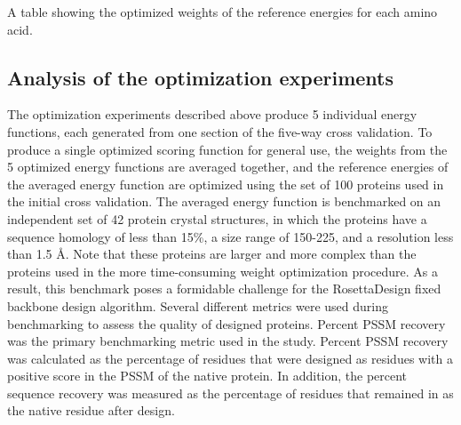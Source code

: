 \begin{table}
\scriptsize
\renewcommand{\tabcolsep}{0.09cm}
\centering

\caption{A table showing the optimized weights of the reference energies for each amino acid. }
\label{table:ref_energy_weights}
\end{table}

\subsection{Analysis of the optimization experiments}
The optimization experiments described above produce 5 individual energy functions, each generated from one section of the five-way cross validation.
To produce a single optimized scoring function for general use, the weights from the 5 optimized energy functions are averaged together, and the reference energies of the averaged energy function are optimized using the set of 100 proteins used in the initial  cross validation.
The averaged energy function is benchmarked on an independent set of 42 protein crystal structures, in which the proteins have a sequence homology of less than 15\%, a size range of 150-225, and a resolution less than 1.5 \AA.
Note that these proteins are larger and more complex than the proteins used in the more time-consuming weight optimization procedure.
As a result, this benchmark poses a formidable challenge for the RosettaDesign fixed backbone design algorithm.
Several different metrics were used during benchmarking to assess the quality of designed proteins.
Percent \ac{PSSM} recovery was the primary benchmarking metric used in the study.
Percent \ac{PSSM} recovery was calculated as the percentage of residues that were designed as residues with a positive score in the \ac{PSSM} of the native protein.
In addition, the percent sequence recovery was measured as the percentage of residues that remained in as the native residue after design. 

